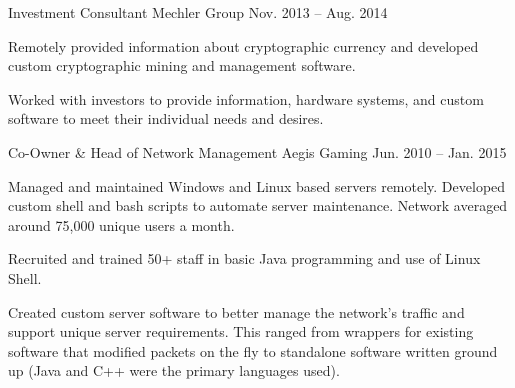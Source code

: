 \begin{cventries}
    \cventry%
      {Investment Consultant} %
      {Mechler Group} %
      {} %
      {Nov. 2013 -- Aug. 2014} %
      {
        \begin{cvitems} %
          \item {Remotely provided information about cryptographic currency and %
          developed custom cryptographic mining and management software.}
          \item {Worked with investors to provide information, %
          hardware systems, and custom software to meet their individual needs %
          and desires.}
        \end{cvitems}
      }

  \cventry%
    {Co-Owner \& Head of Network Management} %
    {Aegis Gaming} %
    {} %
    {Jun. 2010 -- Jan. 2015} %
    {
      \begin{cvitems} %
        \item {Managed and maintained Windows and Linux based servers remotely. %
        Developed custom shell and bash scripts to automate server maintenance. %
        Network averaged around 75,000 unique users a month.}
        \item {Recruited and trained 50+ staff in basic Java programming and %
        use of Linux Shell.}
        \item {Created custom server software to better manage the network's %
        traffic and support unique server requirements. This ranged from %
        wrappers for existing software that modified packets on the fly to %
        standalone software written ground up (Java and C++ were the primary %
        languages used).}
      \end{cvitems}
    }

\end{cventries}
